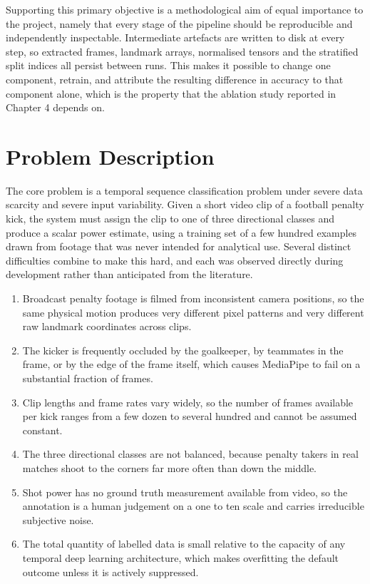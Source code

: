 Supporting this primary objective is a methodological aim of equal importance to the project, namely that every stage of the pipeline should be reproducible and independently inspectable. Intermediate artefacts are written to disk at every step, so extracted frames, landmark arrays, normalised tensors and the stratified split indices all persist between runs. This makes it possible to change one component, retrain, and attribute the resulting difference in accuracy to that component alone, which is the property that the ablation study reported in Chapter 4 depends on.

\section{Problem Description}

The core problem is a temporal sequence classification problem under severe data scarcity and severe input variability. Given a short video clip of a football penalty kick, the system must assign the clip to one of three directional classes and produce a scalar power estimate, using a training set of a few hundred examples drawn from footage that was never intended for analytical use. Several distinct difficulties combine to make this hard, and each was observed directly during development rather than anticipated from the literature.

\begin{enumerate}[label=\roman*.]
    \item Broadcast penalty footage is filmed from inconsistent camera positions, so the same physical motion produces very different pixel patterns and very different raw landmark coordinates across clips.
    \item The kicker is frequently occluded by the goalkeeper, by teammates in the frame, or by the edge of the frame itself, which causes MediaPipe to fail on a substantial fraction of frames.
    \item Clip lengths and frame rates vary widely, so the number of frames available per kick ranges from a few dozen to several hundred and cannot be assumed constant.
    \item The three directional classes are not balanced, because penalty takers in real matches shoot to the corners far more often than down the middle.
    \item Shot power has no ground truth measurement available from video, so the annotation is a human judgement on a one to ten scale and carries irreducible subjective noise.
    \item The total quantity of labelled data is small relative to the capacity of any temporal deep learning architecture, which makes overfitting the default outcome unless it is actively suppressed.
\end{enumerate}

